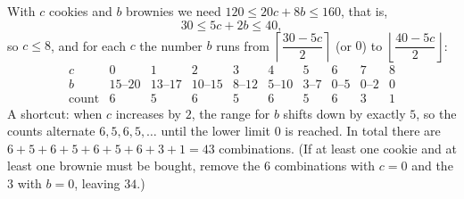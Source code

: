 With $c$ cookies and $b$ brownies we need $120\le20c+8b\le160$, that is,
\[
30\le5c+2b\le40 ,
\]
so $c\le8$, and for each $c$ the number $b$ runs from $\left\lceil\dfrac{30-5c}{2}\right\rceil$ (or $0$) to $\left\lfloor\dfrac{40-5c}{2}\right\rfloor$:
\[
\begin{array}{c|ccccccccc}
c & 0&1&2&3&4&5&6&7&8\\ \hline
b & 15\text{--}20 & 13\text{--}17 & 10\text{--}15 & 8\text{--}12 & 5\text{--}10 & 3\text{--}7 & 0\text{--}5 & 0\text{--}2 & 0\\
\text{count} & 6&5&6&5&6&5&6&3&1
\end{array}
\]
A shortcut: when $c$ increases by $2$, the range for $b$ shifts down by exactly $5$, so the counts alternate $6,5,6,5,\dots$ until the lower limit $0$ is reached. In total there are $6+5+6+5+6+5+6+3+1=\boxed{43}$ combinations. (If at least one cookie and at least one brownie must be bought, remove the $6$ combinations with $c=0$ and the $3$ with $b=0$, leaving $34$.)
